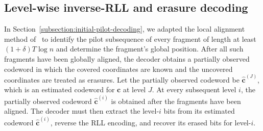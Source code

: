 \documentclass[journal,letterpaper,onecolumn,11pt]{IEEEtran}
\newcommand{\boldc}{\mathbf{c}}
\begin{document}
\subsection{Level-wise inverse-RLL and erasure decoding}\label{subsection:level-erasure-decoding}
In Section~\ref{subsection:initial-pilot-decoding}, we adapted the local
alignment method of~\cite{liu2026improved} to identify the pilot
subsequence of every fragment of length at least $(1+\delta)T\log n$ and  determine the fragment's global position. 
After all such fragments have been globally aligned, the decoder obtains a partially observed codeword in which the covered coordinates are known and the uncovered coordinates are treated as erasures.
Let the partially observed codeword be \(\widehat{\boldc}^{(J)}\), which is an estimated codeword for $\boldc$ at level $J$.
At every subsequent level \(i\), the partially observed codeword \(\widehat{\boldc}^{(i)}\) is obtained after the fragments have been aligned.
The decoder must then extract the level-\(i\) bits from its estimated codeword \(\widehat{\boldc}^{(i)}\), reverse the RLL encoding, and recover its erased bits for level-\(i\).
\end{document}
